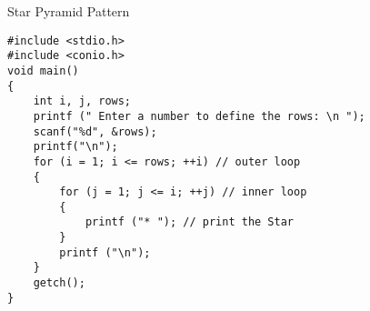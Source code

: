 \iffalse
pyramid of starts
palindrome check
armstrong number check
strong number check
prime number check
addition of 2 numbers
fibonacci series
Floyd's triangle
binary to decimal conversion
calculating power of an integer
check leap year
perfect number check
\fi

Star Pyramid Pattern 
\begin{lstlisting}[style=CStyle]
#include <stdio.h>  
#include <conio.h>  
void main()  
{  
    int i, j, rows;  
    printf (" Enter a number to define the rows: \n ");  
    scanf("%d", &rows);  
    printf("\n");  
    for (i = 1; i <= rows; ++i) // outer loop  
    {  
        for (j = 1; j <= i; ++j) // inner loop  
        {  
            printf ("* "); // print the Star  
        }  
        printf ("\n");   
    }  
    getch();      
}  
\end{lstlisting}